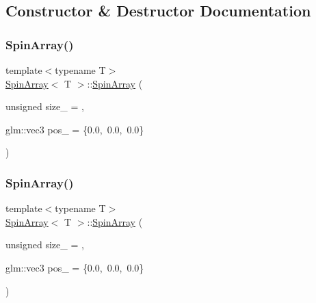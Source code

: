 \subsection{Constructor \& Destructor Documentation}
\mbox{\label{classSpinArray_ab18db2915e18885e5146eef092f4eb67}} 
\subsubsection{\texorpdfstring{Spin\+Array()}{SpinArray()}\hspace{0.1cm}{\footnotesize\ttfamily [1/4]}}
{\footnotesize\ttfamily template$<$typename T$>$ \\
\mbox{\hyperlink{classSpinArray}{Spin\+Array}}$<$ T $>$\+::\mbox{\hyperlink{classSpinArray}{Spin\+Array}} (\begin{DoxyParamCaption}\item[{unsigned}]{size\+\_\+ = {},  }\item[{glm\+::vec3}]{pos\+\_\+ = {\ttfamily \{0.0,~0.0,~0.0\}} }\end{DoxyParamCaption})\hspace{0.3cm}{\ttfamily [inline]}}

\mbox{\label{classSpinArray_ab18db2915e18885e5146eef092f4eb67}} 
\subsubsection{\texorpdfstring{Spin\+Array()}{SpinArray()}\hspace{0.1cm}{\footnotesize\ttfamily [2/4]}}
{\footnotesize\ttfamily template$<$typename T$>$ \\
\mbox{\hyperlink{classSpinArray}{Spin\+Array}}$<$ T $>$\+::\mbox{\hyperlink{classSpinArray}{Spin\+Array}} (\begin{DoxyParamCaption}\item[{unsigned}]{size\+\_\+ = {},  }\item[{glm\+::vec3}]{pos\+\_\+ = {\ttfamily \{0.0,~0.0,~0.0\}} }\end{DoxyParamCaption})\hspace{0.3cm}{\ttfamily [inline]}}

\mbox{\label{classSpinArray_ab18db2915e18885e5146eef092f4eb67}} 
